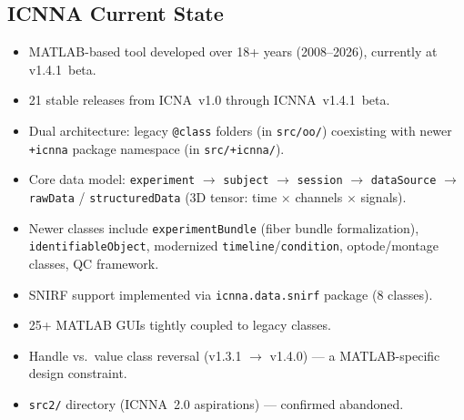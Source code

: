 \documentclass[11pt,a4paper]{article}
\begin{document}
\subsection{ICNNA Current State}
\begin{itemize}
    \item MATLAB-based tool developed over 18+ years (2008--2026), currently at v1.4.1~beta.
    \item 21 stable releases from ICNA~v1.0 through ICNNA~v1.4.1~beta.
    \item Dual architecture: legacy \texttt{@class} folders (in \texttt{src/oo/}) coexisting with newer \texttt{+icnna} package namespace (in \texttt{src/+icnna/}).
    \item Core data model: \texttt{experiment} $\to$ \texttt{subject} $\to$ \texttt{session} $\to$ \texttt{dataSource} $\to$ \texttt{rawData} / \texttt{structuredData} (3D tensor: time $\times$ channels $\times$ signals).
    \item Newer classes include \texttt{experimentBundle} (fiber bundle formalization), \texttt{identifiableObject}, modernized \texttt{timeline}/\texttt{condition}, optode/montage classes, QC framework.
    \item SNIRF support implemented via \texttt{icnna.data.snirf} package (8 classes).
    \item 25+ MATLAB GUIs tightly coupled to legacy classes.
    \item Handle vs.\ value class reversal (v1.3.1 $\to$ v1.4.0) --- a MATLAB-specific design constraint.
    \item \texttt{src2/} directory (ICNNA~2.0 aspirations) --- confirmed abandoned.
\end{itemize}
\end{document}
